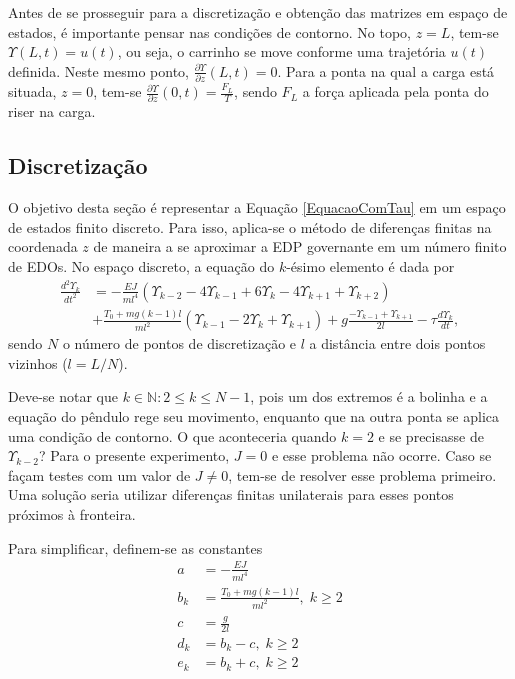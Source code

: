  Antes de se prosseguir para a discretização e obtenção das matrizes em espaço de estados, é importante pensar nas condições de contorno. No topo, $z=L$, tem-se $\Upsilon(L,t)=u(t)$, ou seja, o carrinho se move conforme uma trajetória $u(t)$ definida. Neste mesmo ponto, $\frac{\partial\Upsilon}{\partial z}(L,t) = 0$. Para a ponta na qual a carga está situada, $z=0$, tem-se $\frac{\partial\Upsilon}{\partial z}(0,t) = \frac{F_L}{T}$, sendo $F_L$ a força aplicada pela ponta do riser na carga.

\subsection{Discretização}
O objetivo desta seção é representar a Equação \ref{EquacaoComTau} em um espaço de estados finito discreto.  Para isso, aplica-se o método de diferenças finitas na coordenada $z$ de maneira a se aproximar a EDP governante em um número finito de EDOs. No espaço discreto, a equação do $k$-ésimo elemento é dada por \begin{align}
	\frac{d^2\Upsilon_k}{dt^2} &= -\frac{EJ}{m l^4}\left(\Upsilon_{k-2} - 4\Upsilon_{k-1}+6\Upsilon_{k}-4\Upsilon_{k+1}+\Upsilon_{k+2}\right)\nonumber\\
	&+ \frac{T_0+mg(k-1)l}{m l^2}\left(\Upsilon_{k-1}-2\Upsilon_{k} + \Upsilon_{k+1}\right)+g\frac{-\Upsilon_{k-1}+\Upsilon_{k+1}}{2l}-\tau\frac{d\Upsilon_k}{dt},
\end{align} sendo $N$ o número de pontos de discretização e $l$ a distância entre dois pontos vizinhos ($l = L/N$).

 Deve-se notar que $k\in \mathbb{N}:2\le k \le N-1$, pois um dos extremos é a bolinha e a equação do pêndulo rege seu movimento, enquanto que na outra ponta se aplica uma condição de contorno. O que aconteceria quando $k=2$ e se precisasse de $\Upsilon_{k-2}$? Para o presente experimento, $J=0$ e esse problema não ocorre. Caso se façam testes com um valor de $J\neq 0$, tem-se de resolver esse problema primeiro. Uma solução seria utilizar diferenças finitas unilaterais para esses pontos próximos à fronteira.

 Para simplificar, definem-se as constantes \begin{align}
	a &= -\frac{EJ}{m l^4}\\
	b_k &= \frac{T_0 + mg(k-1)l}{m l^2},\; k\ge 2\\
	c &= \frac{g}{2l}\\
	d_k &= b_k - c,\; k\ge 2\\
	e_k &= b_k + c,\; k\ge 2
\end{align}

